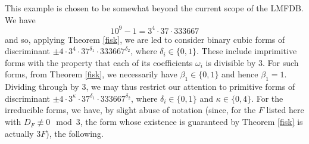 This example is chosen to be somewhat beyond the current scope of the LMFDB.
We have
$$
10^9-1 = 3^4 \cdot 37 \cdot 333667
$$
and so, applying Theorem \ref{fisk}, we are led to consider binary cubic forms of discriminant $\pm 4 \cdot 3^4 \cdot 37^{\delta_1} \cdot 333667^{\delta_2}$, where $\delta_i \in \{ 0, 1 \}$. These include imprimitive forms with the property that each of its coefficients $\omega_i$ is divisible by $3$. For such forms, from Theorem \ref{fisk}, we necessarily have $\beta_1 \in \{ 0, 1 \}$ and hence $\beta_1=1$. Dividing through by $3$, we may thus 
restrict our attention to primitive forms of discriminant $\pm 4 \cdot 3^\kappa \cdot 37^{\delta_1} \cdot 333667^{\delta_2}$, where $\delta_i \in \{ 0, 1 \}$
 and $\kappa \in \{ 0, 4 \}$.
For the irreducible forms, we have, by slight abuse of notation (since, for the $F$ listed here with $D_F \not\equiv 0 \mod{3}$, the form whose existence is guaranteed by Theorem \ref{fisk} is actually $3F$), the following.

